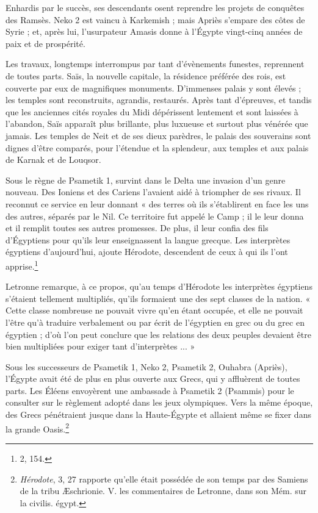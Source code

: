 \documentclass[letterpaper,twocolumn,openany,nodeprecatedcode]{dndbook}
\begin{document}
Enhardis par le succès, ses descendants osent reprendre les projets de conquêtes des Ramsès. Neko 2 est vaincu à Karkemish ; mais Apriès s'empare des côtes de Syrie ; et, après lui, l'usurpateur Amasis donne à l'Égypte vingt-cinq années de paix et de prospérité.

Les travaux, longtemps interrompus par tant d'évènements funestes, reprennent de toutes parts. Saïs, la nouvelle capitale, la résidence préférée des rois, est couverte par eux de magnifiques monuments. D'immenses palais y sont élevés ; les temples sont reconstruits, agrandis, restaurés. Après tant d'épreuves, et tandis que les anciennes cités royales du Midi dépérissent lentement et sont laissées à l'abandon, Saïs apparaît plus brillante, plus luxueuse et surtout plus vénérée que jamais. Les temples de Neit et de ses dieux parèdres, le palais des souverains sont dignes d'être comparés, pour l'étendue et la splendeur, aux temples et aux palais de Karnak et de Louqsor.

Sous le règne de Psametik 1, survint dans le Delta une invasion d'un genre nouveau. Des Ioniens et des Cariens l'avaient aidé à triompher de ses rivaux. Il reconnut ce service en leur donnant « des terres où ils s'établirent en face les uns des autres, séparés par le Nil. Ce territoire fut appelé le Camp ; il le leur donna et il remplit toutes ses autres promesses. De plus, il leur confia des fils d'Égyptiens pour qu'ils leur enseignassent la langue grecque. Les interprètes égyptiens d'aujourd’hui, ajoute Hérodote, descendent de ceux à qui ils l'ont apprise.\footnote{2, 154.}

Letronne remarque, à ce propos, qu'au temps d'Hérodote les interprètes égyptiens s'étaient tellement multipliés, qu'ils formaient une des sept classes de la nation. « Cette classe nombreuse ne pouvait vivre qu'en étant occupée, et elle ne pouvait l'être qu'à traduire verbalement ou par écrit de l'égyptien en grec ou du grec en égyptien ; d'où l'on peut conclure que les relations des deux peuples devaient être bien multipliées pour exiger tant d'interprètes ... »

Sous les successeurs de Psametik 1, Neko 2, Psametik 2, Ouhabra (Apriès), l'Égypte avait été de plus en plus ouverte aux Grecs, qui y affluèrent de toutes parts. Les Éléens envoyèrent une ambassade à Psametik 2 (Psammis) pour le consulter sur le règlement adopté dans les jeux olympiques. Vers la même époque, des Grecs pénétraient jusque dans la Haute-Égypte et allaient même se fixer dans la grande Oasis.\footnote{\emph{Hérodote}, 3, 27 rapporte qu'elle était possédée de son temps par des Samiens de la tribu Æschrionie. V. les commentaires de Letronne, dans son Mém. sur la civilis. égypt.}
\end{document}
